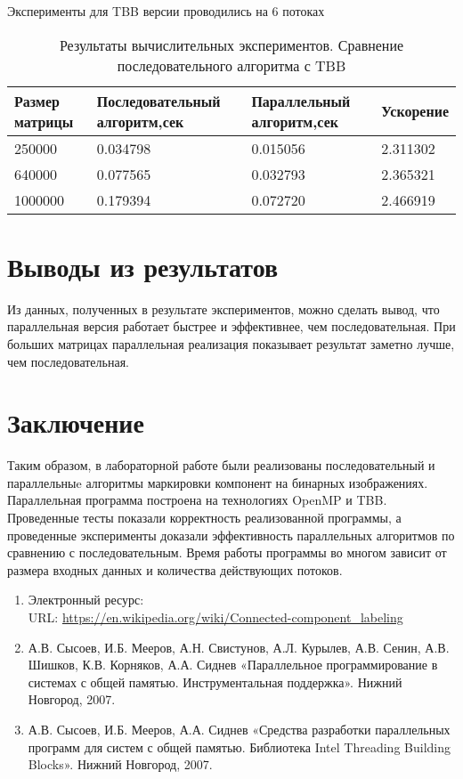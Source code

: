 \documentclass[12pt]{article}
\begin{document}
\par Эксперименты для TBB версии проводились на 6 потоках
\begin{table}[!h]
\caption{Результаты вычислительных экспериментов. Сравнение последовательного алгоритма с TBB}
\centering
\begin{tabular}{|p{4cm}|p{4cm}|p{4cm}|p{3cm}|}
\hline
Размер матрицы & Последовательный алгоритм,сек & Параллельный алгоритм,сек & Ускорение  \\\hline
250000  & 0.034798 & 0.015056 & 2.311302  \\\hline
640000  & 0.077565 & 0.032793 & 2.365321  \\\hline
1000000 & 0.179394 & 0.072720 & 2.466919  \\
\hline
\end{tabular}
\end{table}

\newpage

\section*{Выводы из результатов}
\par  Из данных, полученных в результате экспериментов, можно сделать вывод, что параллельная версия работает быстрее и эффективнее, чем последовательная.
При больших матрицах параллельная реализация показывает результат заметно лучше, чем последовательная. 
\newpage

\section*{Заключение}
Таким образом, в лабораторной работе были реализованы последовательный и параллельныe алгоритмы маркировки компонент на бинарных изображениях. Параллельная программа построена на технологиях OpenMP и TBB.
Проведенные тесты показали корректность реализованной программы, а проведенные эксперименты доказали эффективность параллельных алгоритмов по сравнению с последовательным. Время работы программы во многом зависит от размера входных данных и количества действующих потоков. 
\newpage

\begin{enumerate}
\item Электронный ресурс: \\
URL: \url{https://en.wikipedia.org/wiki/Connected-component_labeling}
\item А.В. Сысоев, И.Б. Мееров, А.Н. Свистунов, А.Л. Курылев, А.В. Сенин, А.В. Шишков, К.В. Корняков, А.А. Сиднев «Параллельное программирование в системах с общей памятью. Инструментальная поддержка». Нижний Новгород, 2007.
\item А.В. Сысоев, И.Б. Мееров, А.А. Сиднев «Средства разработки параллельных программ для систем с общей памятью. Библиотека Intel Threading Building Blocks». Нижний Новгород, 2007. 
\end{enumerate}
\newpage
\end{document}
